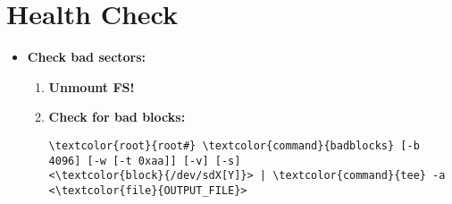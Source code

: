 \documentclass[10pt, a4paper, onecolumn, oneside, titlepage, openany]{book}
\begin{document}
\section{Health Check}
\begin{itemize}
    \item \textbf{Check bad sectors:}
    \begin{enumerate}
        \item \textbf{Unmount FS!}
        \item \textbf{Check for bad blocks:}
\begin{Verbatim}[commandchars=\\\{\}]
\textcolor{root}{root#} \textcolor{command}{badblocks} [-b 4096] [-w [-t 0xaa]] [-v] [-s]
<\textcolor{block}{/dev/sdX[Y]}> | \textcolor{command}{tee} -a <\textcolor{file}{OUTPUT_FILE}>
\end{Verbatim}
    \end{enumerate}
\end{itemize}
\end{document}
